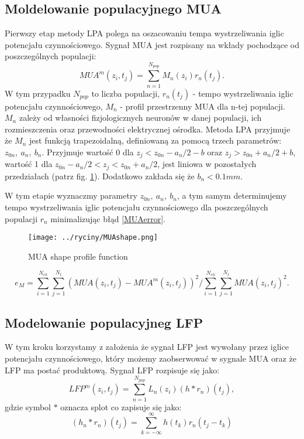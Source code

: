 \subsection{Moldelowanie populacyjnego MUA}
Pierwszy etap metody LPA polega na oszacowaniu tempa wystrzeliwania iglic potencjału czynnościowego. Sygnał MUA jest rozpisany na wkłady pochodzące od poszczególnych populacji:
\begin{equation}
MUA^m(z_i, t_j) = \sum^{N_{pop}}_{n=1} M_n(z_i)r_n(t_j).
\label{MUAdecomposition}
\end{equation}
W tym przypadku $N_{pop}$ to liczba populacji, $r_n(t_j)$ - tempo wystrzeliwania iglic potencjału czynnościowego,  $M_n$ - profil przestrzenny MUA dla n-tej populacji. $M_n$ zależy od własności fizjologicznych neuronów w danej populacji, ich rozmieszczenia oraz przewodności elektrycznej ośrodka. Metoda LPA przyjmuje że $M_n$ jest funkcją trapezoidalną, definiowaną za pomocą trzech parametrów: $z_{0n}, \ a_n, \ b_n$. Przyjmuje wartość 0 dla $z_{j}< z_{0n} - a_n/2 - b$ oraz $z_{j} > z_{0n} + a_n/2 + b$, wartość 1 dla $z_{0n} - a_n/2 < z_j < z_{0n} + a_n/2$, jest liniowa w pozostałych przedziałach (patrz fig. \ref{MUAshape}). Dodatkowo zakłada się że $b_n < 0.1 mm$.

W tym etapie wyznaczmy parametry $z_{0n}, \ a_n, \ b_n$, a tym samym determinujemy tempo wystrzeliwania iglic potencjału czynnościowego dla poszczególnych populacji $r_n$ minimalizując błąd \ref{MUAerror}.

\begin{figure}
\caption{MUA shape profile function}
\label{MUAshape}
\texttt{[image: ../ryciny/MUAshape.png]}
\end{figure}

\begin{equation}
e_M = \sum^{N_{ch}}_{i=1}\sum^{N_t}_{j=1} \left( MUA(z_i, t_j) - MUA^m(z_i, t_j) \right)^2/ \sum^{N_{ch}}_{i=1}\sum^{N_t}_{j=1} MUA(z_i, t_j)^2.
\label{MUAerror}
\end{equation}

\subsection{Modelowanie populacyjneg LFP}
W tym kroku korzystamy z założenia że sygnał LFP jest wywołany przez iglice potencjału czynnościowego, który możemy zaobserwować w sygnale MUA oraz że LFP ma postać produktową. Sygnał LFP rozpisuje się jako:
\begin{equation}
 LFP^m(z_i, t_j) = \sum^{N_{pop}}_{n=1}L_n(z_i)(h*r_n)(t_j),
 \label{LFPdecomposition}
\end{equation}
gdzie symbol $*$ oznacza splot co zapisuje się jako:
\begin{equation}
(h_n*r_n)(t_j) = \sum_{k = -\infty}^{\infty}h(t_k)r_n(t_j - t_k)
\label{splot}
\end{equation}

